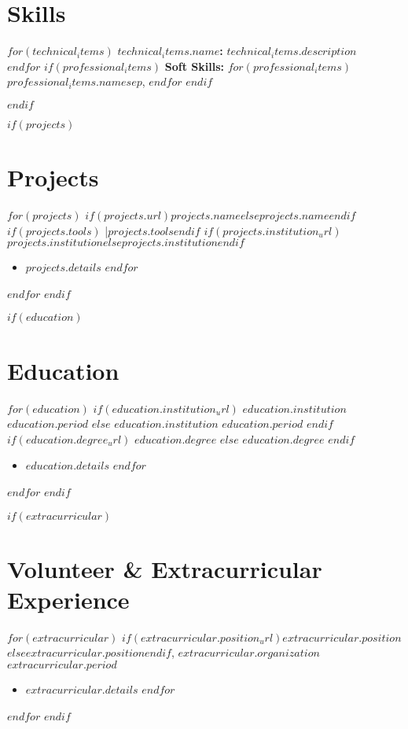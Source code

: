 \documentclass[10.5pt,a4paper]{article}
\newcommand{\daterange}[1]{\textbf{#1}}
\newcommand{\entryHeader}[2]{\noindent\textbf{#1} \hfill \daterange{#2}}
\newcommand{\entryHeaderLinked}[3]{\noindent\textbf{\href{#1}{#2}} \hfill \daterange{#3}}
\newcommand{\entrySubHeader}[1]{\textit{#1}}
\newcommand{\entrySubHeaderLinked}[2]{\textit{\href{#1}{#2}}}
\newenvironment{entryDetails}
  {%
    \begin{itemize}[leftmargin=2.5em, rightmargin=2.5em, itemsep=1pt, topsep=1pt, parsep=0pt]
  }
  {%
    \end{itemize}
    \vspace{-0.1cm}
  }
\begin{document}
\section*{Skills}
\begin{multicols}{2}
	\raggedcolumns
	$for(technical_items)$
	\noindent\textbf{$technical_items.name$:} $technical_items.description$\\[2pt]
	$endfor$
	$if(professional_items)$
	\noindent\textbf{Soft Skills:} $for(professional_items)$$professional_items.name$$sep$, $endfor$
	$endif$
\end{multicols}
$endif$

$if(projects)$
\section*{Projects}
$for(projects)$
\noindent\textbf{$if(projects.url)$\href{$projects.url$}{$projects.name$}$else$$projects.name$$endif$}$if(projects.tools)$ \quad|\quad \textit{\small $projects.tools$}$endif$ \hfill \textbf{$if(projects.institution_url)$\href{$projects.institution_url$}{$projects.institution$}$else$\textit{$projects.institution$}$endif$}
\begin{entryDetails}
	$for(projects.details)$
	\item $projects.details$
	$endfor$
\end{entryDetails}
$endfor$
$endif$

$if(education)$
\section*{Education}
$for(education)$
$if(education.institution_url)$
\entryHeaderLinked{$education.institution_url$}{$education.institution$}{$education.period$}
$else$
\entryHeader{$education.institution$}{$education.period$}
$endif$
\\
$if(education.degree_url)$
\entrySubHeaderLinked{$education.degree_url$}{$education.degree$}
$else$
\entrySubHeader{$education.degree$}
$endif$
\begin{itemize}[leftmargin=1.5em, rightmargin=1em, itemsep=1pt, topsep=1pt, parsep=0pt]
	$for(education.details)$
	\item $education.details$
	      $endfor$
\end{itemize}
\vspace{-0.1cm}
$endfor$
$endif$

$if(extracurricular)$
\section*{Volunteer \& Extracurricular Experience}
$for(extracurricular)$
\noindent\textbf{$if(extracurricular.position_url)$\href{$extracurricular.position_url$}{$extracurricular.position$}$else$$extracurricular.position$$endif$}, $extracurricular.organization$ \hfill \daterange{$extracurricular.period$}
\begin{entryDetails}
	$for(extracurricular.details)$
	\item $extracurricular.details$
	$endfor$
\end{entryDetails}
$endfor$
$endif$
\end{document}
